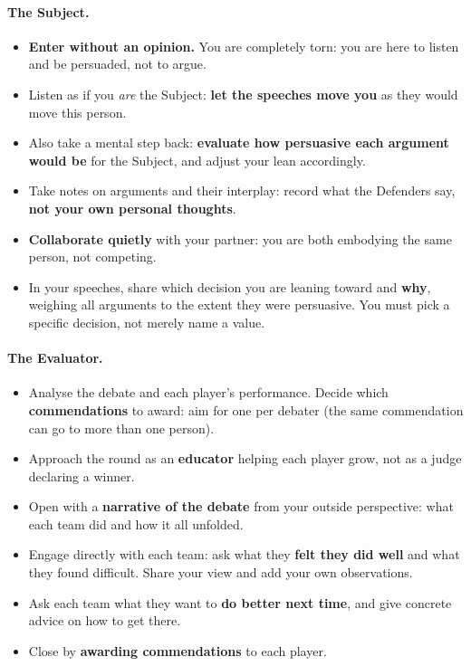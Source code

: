 \documentclass[12pt]{article}
\begin{document}
\paragraph{The Subject.}
\begin{itemize}
    \item \textbf{Enter without an opinion.} You are completely torn: you are here to listen and be persuaded, not to argue.
    \item Listen as if you \textit{are} the Subject: \textbf{let the speeches move you} as they would move this person.
    \item Also take a mental step back: \textbf{evaluate how persuasive each argument would be} for the Subject, and adjust your lean accordingly.
    \item Take notes on arguments and their interplay: record what the Defenders say, \textbf{not your own personal thoughts}.
    \item \textbf{Collaborate quietly} with your partner: you are both embodying the same person, not competing.
    \item In your speeches, share which decision you are leaning toward and \textbf{why}, weighing all arguments to the extent they were persuasive. You must pick a specific decision, not merely name a value.
\end{itemize}

\paragraph{The Evaluator.}
\begin{itemize}
    \item Analyse the debate and each player's performance. Decide which \textbf{commendations} to award: aim for one per debater (the same commendation can go to more than one person).
    \item Approach the round as an \textbf{educator} helping each player grow, not as a judge declaring a winner.
    \item Open with a \textbf{narrative of the debate} from your outside perspective: what each team did and how it all unfolded.
    \item Engage directly with each team: ask what they \textbf{felt they did well} and what they found difficult. Share your view and add your own observations.
    \item Ask each team what they want to \textbf{do better next time}, and give concrete advice on how to get there.
    \item Close by \textbf{awarding commendations} to each player.
\end{itemize}
\end{document}
